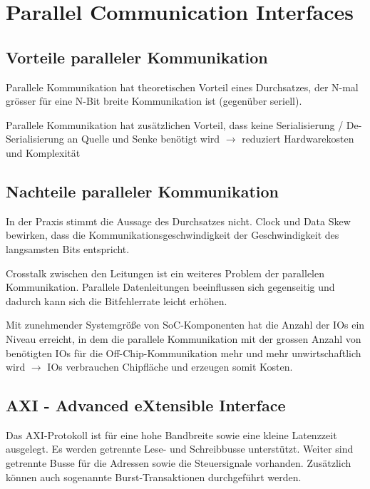 \section{Parallel Communication Interfaces}
\subsection{Vorteile paralleler Kommunikation}
\begin{compactitem}
    \item Parallele Kommunikation hat theoretischen Vorteil eines Durchsatzes, der N-mal grösser für eine N-Bit breite Kommunikation ist (gegenüber seriell). 
    \item Parallele Kommunikation hat zusätzlichen Vorteil, dass keine Serialisierung / De-Serialisierung an Quelle und Senke benötigt wird $\rightarrow$ reduziert Hardwarekosten und Komplexität 
\end{compactitem} 

\subsection{Nachteile paralleler Kommunikation}
\begin{compactitem}
    \item In der Praxis stimmt die Aussage des Durchsatzes nicht. Clock und Data Skew bewirken, dass die Kommunikationsgeschwindigkeit der Geschwindigkeit des langsamsten Bits entspricht.
    \item Crosstalk zwischen den Leitungen ist ein weiteres Problem der parallelen Kommunikation. Parallele Datenleitungen beeinflussen sich gegenseitig und dadurch kann sich die Bitfehlerrate leicht erhöhen.
    \item Mit zunehmender Systemgröße von SoC-Komponenten hat die Anzahl der IOs ein Niveau erreicht, in dem die parallele Kommunikation mit der grossen Anzahl von benötigten IOs für die Off-Chip-Kommunikation mehr und mehr unwirtschaftlich wird $\rightarrow$ IOs verbrauchen Chipfläche und erzeugen somit Kosten.
\end{compactitem}

\subsection{AXI - Advanced eXtensible Interface}
Das AXI-Protokoll ist für eine hohe Bandbreite sowie eine kleine Latenzzeit ausgelegt. Es werden getrennte Lese- und Schreibbusse unterstützt. Weiter sind getrennte Busse für die Adressen sowie die Steuersignale vorhanden. Zusätzlich können auch sogenannte Burst-Transaktionen durchgeführt werden.
